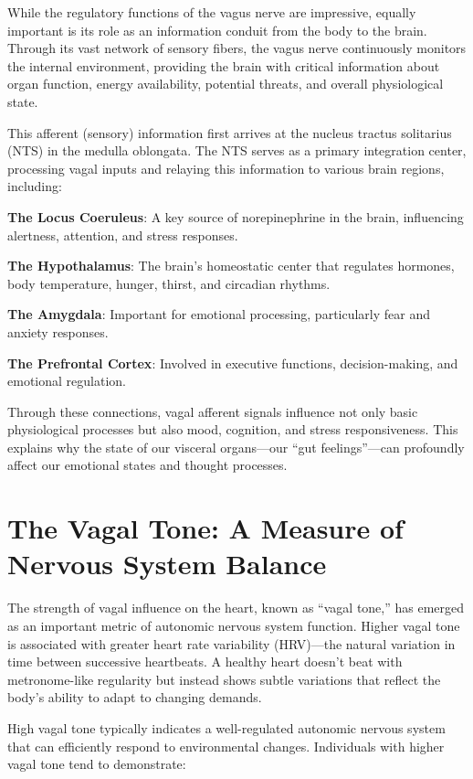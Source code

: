 \documentclass[
  Letterpaper,
]{scrbook}
\begin{document}
While the regulatory functions of the vagus nerve are impressive,
equally important is its role as an information conduit from the body to
the brain. Through its vast network of sensory fibers, the vagus nerve
continuously monitors the internal environment, providing the brain with
critical information about organ function, energy availability,
potential threats, and overall physiological state.

This afferent (sensory) information first arrives at the nucleus tractus
solitarius (NTS) in the medulla oblongata. The NTS serves as a primary
integration center, processing vagal inputs and relaying this
information to various brain regions, including:

\textbf{The Locus Coeruleus}: A key source of norepinephrine in the
brain, influencing alertness, attention, and stress responses.

\textbf{The Hypothalamus}: The brain's homeostatic center that regulates
hormones, body temperature, hunger, thirst, and circadian rhythms.

\textbf{The Amygdala}: Important for emotional processing, particularly
fear and anxiety responses.

\textbf{The Prefrontal Cortex}: Involved in executive functions,
decision-making, and emotional regulation.

Through these connections, vagal afferent signals influence not only
basic physiological processes but also mood, cognition, and stress
responsiveness. This explains why the state of our visceral organs---our
``gut feelings''---can profoundly affect our emotional states and
thought processes.

\section{The Vagal Tone: A Measure of Nervous System
Balance}\label{the-vagal-tone-a-measure-of-nervous-system-balance}

The strength of vagal influence on the heart, known as ``vagal tone,''
has emerged as an important metric of autonomic nervous system function.
Higher vagal tone is associated with greater heart rate variability
(HRV)---the natural variation in time between successive heartbeats. A
healthy heart doesn't beat with metronome-like regularity but instead
shows subtle variations that reflect the body's ability to adapt to
changing demands.

High vagal tone typically indicates a well-regulated autonomic nervous
system that can efficiently respond to environmental changes.
Individuals with higher vagal tone tend to demonstrate:
\end{document}
